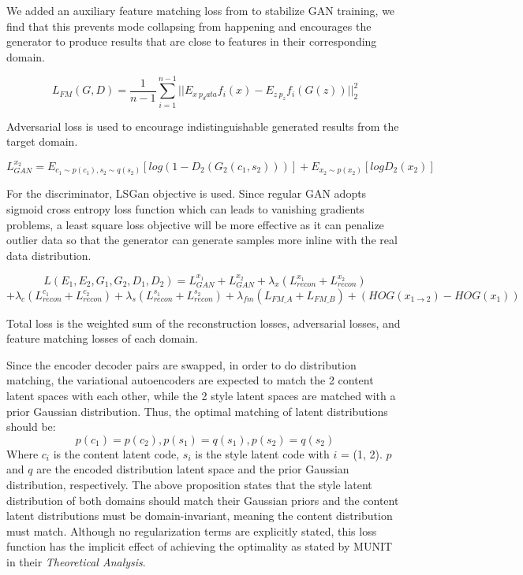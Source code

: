 \documentclass[12pt]{report}
\begin{document}
We added an auxiliary feature matching loss from\cite{fm-loss} to stabilize GAN training, we find that this prevents mode collapsing from happening and encourages the generator to produce results that are close to features in their corresponding domain.

\[L_{FM}(G, D) = \frac{1}{n - 1} \sum_{i=1}^{n-1} ||E_{x~p_data}f_i(x) - E_{z~p_z}f_i(G(z))||_2^2 \]

Adversarial loss is used to encourage indistinguishable generated results from the target domain.

\[L^{x_2}_{GAN} = E_{c_1\sim p(c_1), s_2\sim q(s_2)}[log(1 - D_2(G_2(c_1, s_2)))] + E_{x_2\sim p(x_2)}[log D_2(x_2)]\]

For the discriminator, LSGan objective \cite{ls-gan} is used. Since regular GAN adopts sigmoid cross entropy loss function which can leads to vanishing gradients problems, a least square loss objective will be more effective as it can penalize outlier data so that the generator can generate samples more inline with the real data distribution.

\[L(E_1, E_2, G_1, G_2, D_1, D_2) = L^{x_1}_{GAN} + L^{x_2}_{GAN} + {\lambda}_x(L^{x_1}_{recon} + L^{x_2}_{recon}) \]
\[+ {\lambda}_c(L^{c_1}_{recon} + L^{c_2}_{recon}) + {\lambda}_s(L^{s_1}_{recon} + L^{s_2}_{recon}) + {\lambda}_{fm}(L_{FM\_A} + L_{FM\_B}) +(HOG(x_{1\rightarrow 2}) - HOG(x_1))\]
 
Total loss is the weighted sum of the reconstruction losses, adversarial losses, and feature matching losses of each domain.

Since the encoder decoder pairs are swapped, in order to do distribution matching, the variational autoencoders are expected to match the 2 content latent spaces with each other, while the 2 style latent spaces are matched with a prior Gaussian distribution. Thus, the optimal matching of latent distributions should be:
\[p(c_1) = p(c_2), p(s_1) = q(s_1), p(s_2) = q(s_2)\]
Where $c_i$ is the content latent code, $s_i$ is the style latent code with $i$ = (1, 2). $p$ and $q$ are the encoded distribution latent space and the prior Gaussian distribution, respectively. The above proposition states that the style latent distribution of both domains should match their Gaussian priors and the content latent distributions must be domain-invariant, meaning the content distribution must match. Although no regularization terms are explicitly stated, this loss function has the implicit effect of achieving the optimality as stated by MUNIT\cite{munit} in their \textit{Theoretical Analysis}.
\end{document}
